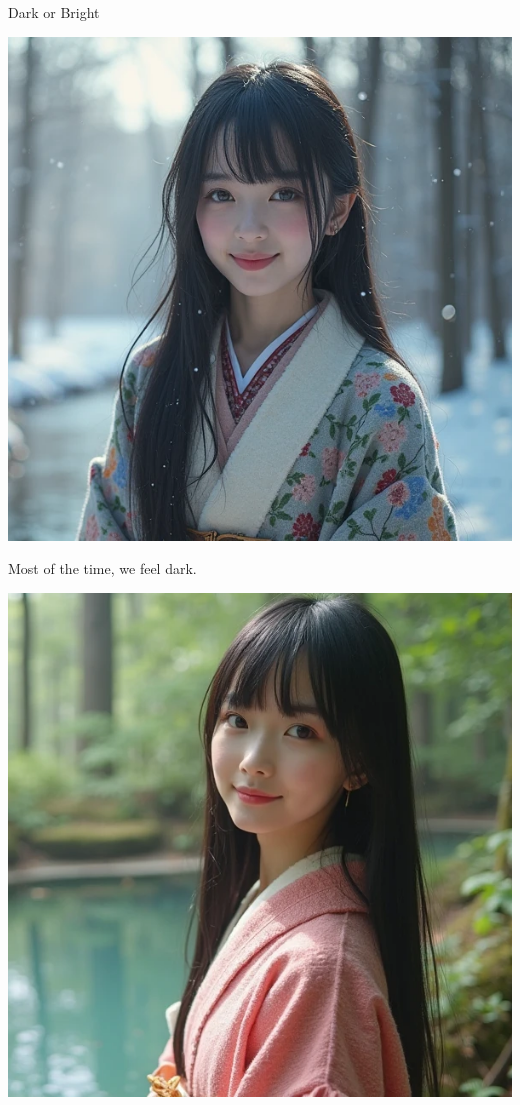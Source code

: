 \documentclass{beamer}
\begin{document}
\begin{frame}{Dark or Bright}
\begin{minipage}{0.4\textwidth}
\begin{center}
\includegraphics[width=\textwidth]{dark.png}
\end{center}
\begin{center}
Most of the time, we feel dark.
\end{center}
\end{minipage}
\hfill
\begin{minipage}{0.4\textwidth}
\begin{center}
\includegraphics[width=\textwidth]{bright.png}

\end{center}
\end{minipage}
\end{frame}
\end{document}
